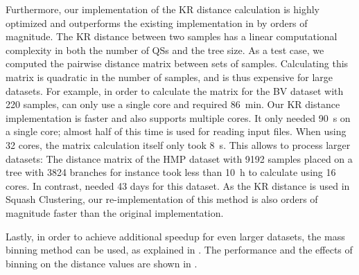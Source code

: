 Furthermore, %
our implementation of the KR distance calculation is highly optimized and
outperforms the existing implementation in  \cite{Matsen2010} by orders of magnitude.
The KR distance between two samples has a linear computational complexity in both the number of \acp{QS} and the tree size.
As a test case, we computed the pairwise distance matrix between sets of samples.
Calculating this matrix is quadratic in the number of samples,
and is thus expensive for large datasets.
For example, in order to calculate the matrix for the \ac{BV} dataset with \num{220} samples,
 can only use a single core and required \SI{86}{\minute}.
Our KR distance implementation is faster and also supports multiple cores.
It only needed \SI{90}{\second} on a single core; almost half of this time is used for reading input files.
When using \num{32} cores, the matrix calculation itself only took \SI{8}{\second}.
This allows to process larger datasets:
The distance matrix of the \ac{HMP} dataset with \num{9 192} samples placed on a tree with \num{3 824} branches
for instance took less than \SI{10}{\hour} to calculate using \num{16} cores.
In contrast,  needed \num{43} days for this dataset.
As the KR distance is used in Squash Clustering, our re-implementation of this method
is also orders of magnitude faster than the original  implementation.

Lastly, in order to achieve additional speedup for even larger datasets, the mass binning method can be used,
as explained in .
The performance and the effects of binning on the distance values are shown in .

